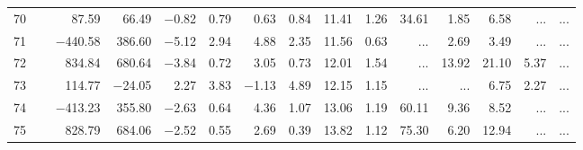 \begin{table*}[p]
{\begin{tabular}{l@{ }r@{ \ }rr@{ \ }rr@{ \ }rrrr@{ \ }r@{ \ }r@{ \ }r@{ \ }r}
 70   \ \dotfill \  &     87.59 &     66.49 &  $-$0.82 &   0.79 &    0.63 &   0.84&   11.41 &   1.26&       34.61 &        1.85 &        6.58 &    ...     &    ...       \\     
 71   \ \dotfill \  &  $-$440.58 &    386.60 &  $-$5.12 &   2.94 &    4.88 &   2.35&   11.56 &   0.63&    ...     &        2.69 &        3.49 &    ...     &    ...       \\     
 72   \ \dotfill \  &    834.84 &    680.64 &  $-$3.84 &   0.72 &    3.05 &   0.73&   12.01 &   1.54&    ...     &       13.92 &       21.10 &        5.37 &    ...       \\     
 73   \ \dotfill \  &    114.77 &   $-$24.05 &    2.27 &   3.83 &  $-$1.13 &   4.89&   12.15 &   1.15&    ...     &    ...     &        6.75 &        2.27 &    ...       \\     
 74   \ \dotfill \  &  $-$413.23 &    355.80 &  $-$2.63 &   0.64 &    4.36 &   1.07&   13.06 &   1.19&       60.11 &        9.36 &        8.52 &    ...     &    ...       \\     
 75   \ \dotfill \  &    828.79 &    684.06 &  $-$2.52 &   0.55 &    2.69 &   0.39&   13.82 &   1.12&       75.30 &        6.20 &       12.94 &    ...     &    ...       \\     


\end{tabular}}
\end{table*}
